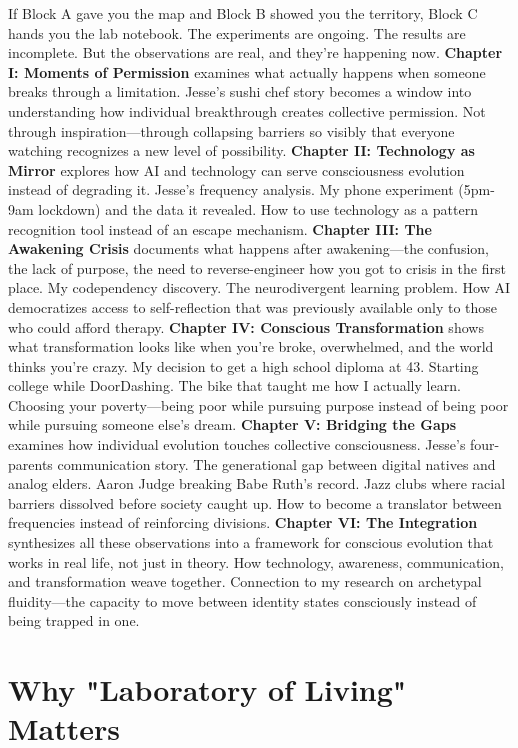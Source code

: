 \documentclass[12pt,openany]{book}
\begin{document}
If Block A gave you the map and Block B showed you the territory, Block C hands you the lab notebook.
The experiments are ongoing. The results are incomplete. But the observations are real, and they're happening now.
\textbf{Chapter I: Moments of Permission} examines what actually happens when someone breaks through a limitation. Jesse's sushi chef story becomes a window into understanding how individual breakthrough creates collective permission. Not through inspiration—through collapsing barriers so visibly that everyone watching recognizes a new level of possibility.
\textbf{Chapter II: Technology as Mirror} explores how AI and technology can serve consciousness evolution instead of degrading it. Jesse's frequency analysis. My phone experiment (5pm-9am lockdown) and the data it revealed. How to use technology as a pattern recognition tool instead of an escape mechanism.
\textbf{Chapter III: The Awakening Crisis} documents what happens after awakening—the confusion, the lack of purpose, the need to reverse-engineer how you got to crisis in the first place. My codependency discovery. The neurodivergent learning problem. How AI democratizes access to self-reflection that was previously available only to those who could afford therapy.
\textbf{Chapter IV: Conscious Transformation} shows what transformation looks like when you're broke, overwhelmed, and the world thinks you're crazy. My decision to get a high school diploma at 43. Starting college while DoorDashing. The bike that taught me how I actually learn. Choosing your poverty—being poor while pursuing purpose instead of being poor while pursuing someone else's dream.
\textbf{Chapter V: Bridging the Gaps} examines how individual evolution touches collective consciousness. Jesse's four-parents communication story. The generational gap between digital natives and analog elders. Aaron Judge breaking Babe Ruth's record. Jazz clubs where racial barriers dissolved before society caught up. How to become a translator between frequencies instead of reinforcing divisions.
\textbf{Chapter VI: The Integration} synthesizes all these observations into a framework for conscious evolution that works in real life, not just in theory. How technology, awareness, communication, and transformation weave together. Connection to my research on archetypal fluidity—the capacity to move between identity states consciously instead of being trapped in one.

\section{Why "Laboratory of Living" Matters}
\end{document}
